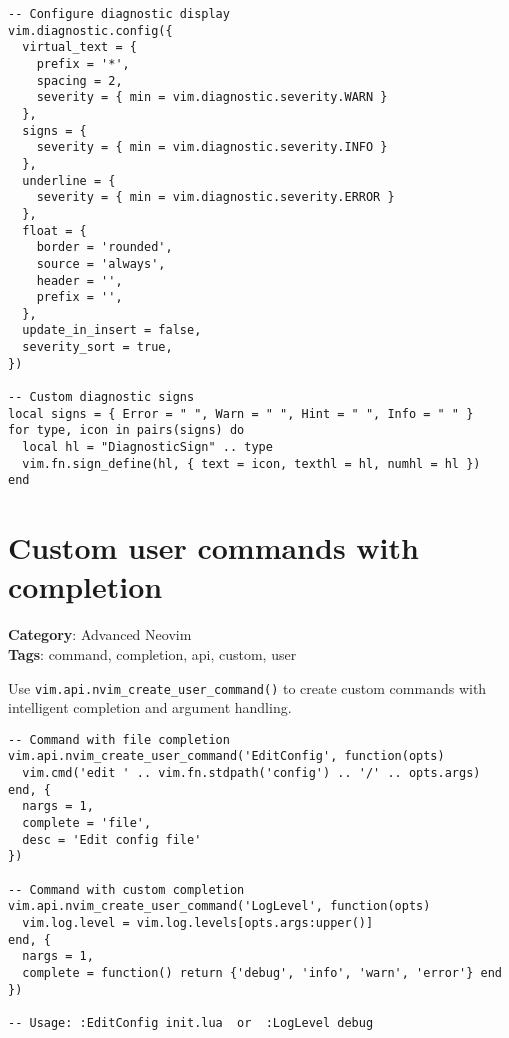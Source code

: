 {{{{{{{\begin{Exa*}{}
\begin{Verbatim}[fontsize=\footnotesize, breaklines, breakanywhere]
-- Configure diagnostic display
vim.diagnostic.config({
  virtual_text = {
    prefix = '*',
    spacing = 2,
    severity = { min = vim.diagnostic.severity.WARN }
  },
  signs = {
    severity = { min = vim.diagnostic.severity.INFO }
  },
  underline = {
    severity = { min = vim.diagnostic.severity.ERROR }
  },
  float = {
    border = 'rounded',
    source = 'always',
    header = '',
    prefix = '',
  },
  update_in_insert = false,
  severity_sort = true,
})

-- Custom diagnostic signs
local signs = { Error = " ", Warn = " ", Hint = " ", Info = " " }
for type, icon in pairs(signs) do
  local hl = "DiagnosticSign" .. type
  vim.fn.sign_define(hl, { text = icon, texthl = hl, numhl = hl })
end
\end{Verbatim}
\end{Exa*}

\section{Custom user commands with completion}

\textbf{Category}: Advanced Neovim\\ \textbf{Tags}: command, completion, api, custom, user
\vspace{0.5cm}

Use {\footnotesize \Verb§vim.api.nvim_create_user_command()§} to create custom commands with intelligent completion and argument handling.

\begin{Exa*}{}
\begin{Verbatim}[fontsize=\footnotesize, breaklines, breakanywhere]
-- Command with file completion
vim.api.nvim_create_user_command('EditConfig', function(opts)
  vim.cmd('edit ' .. vim.fn.stdpath('config') .. '/' .. opts.args)
end, {
  nargs = 1,
  complete = 'file',
  desc = 'Edit config file'
})

-- Command with custom completion
vim.api.nvim_create_user_command('LogLevel', function(opts)
  vim.log.level = vim.log.levels[opts.args:upper()]
end, {
  nargs = 1,
  complete = function() return {'debug', 'info', 'warn', 'error'} end
})

-- Usage: :EditConfig init.lua  or  :LogLevel debug
\end{Verbatim}
\end{Exa*}

}}}}}}}
